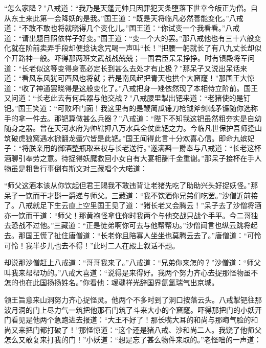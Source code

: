 \documentclass[12pt,UTF8]{ctexbook}
\begin{document}
“怎么家降？”八戒道：“我乃是天蓬元帅只因罪犯天条堕落下世幸今皈正为僧。自从东土来此第一会降妖的是我。”国王道：“既是天将临凡必然善能变化。”八戒道：“不敢不敢也将就晓得几个变化儿。”国王道：“你试变一个我看看。”八戒道：“请出题目照依样子好变。”国王道：“变一个大的罢。”那八戒他也有三十六般变化就在阶前卖弄手段却便捻诀念咒喝一声叫“长！”把腰一躬就长了有八九丈长却似个开路神一般。吓得那两班文武战战兢兢；一国君臣呆呆挣挣。时有镇殿将军问道：“长老似这等变得身高必定长到甚么去处才有止极？”那呆子又说出呆话来道：“看风东风犹可西风也将就；若是南风起把青天也拱个大窟窿！”那国王大惊道：“收了神通罢晓得是这般变化了。”八戒把身一矬依然现了本相侍立阶前。国王又问道：“长老此去有何兵器与他交战？”八戒腰里掣出钯来道：“老猪使的是钉钯。”国王笑道：“可败坏门面！我这里有的是鞭简瓜锤刀枪钺斧剑戟矛镰随你选称手的拿一件去。那钯算做甚么兵器？”八戒道：“陛下不知我这钯虽然粗夯实是自幼随身之器。曾在天河水府为帅辖押八万水兵全仗此钯之力。今临凡世保护吾师逢山筑破虎狼窝遇水掀翻龙蜃穴皆是此钯。”国王闻得此言十分欢喜心信。即命九嫔妃子：“将朕亲用的御酒整瓶取来权与长老送行。”遂满斟一爵奉与八戒道：“长老这杯酒聊引奉劳之意。待捉得妖魔救回小女自有大宴相酬千金重谢。”那呆子接杯在手人物虽是粗鲁行事倒有斯文对三藏唱个大喏道：

“师父这酒本该从你饮起但君王赐我不敢违背让老猪先吃了助助兴头好捉妖怪。”那呆子一饮而干才斟一爵递与师父。三藏道：“我不饮酒你兄弟们吃罢。”沙僧近前接了。八戒就足下生云直上空里国王见了道：“猪长老又会腾云！”呆子去了沙僧将酒亦一饮而干道：“师父！那黄袍怪拿住你时我两个与他交战只战个手平。今二哥独去恐战不过他。”三藏道：“正是徒弟啊你可去与他帮帮功。”沙僧闻言也纵云跳将起去。那国王慌了扯住唐僧道：“长老你且陪寡人坐坐也莫腾云去了。”唐僧道：“可怜可怜！我半步儿也去不得！”此时二人在殿上叙话不题。

却说那沙僧赶上八戒道：“哥哥我来了。”八戒道：“兄弟你来怎的？”沙僧道：“师父叫我来帮帮功的。”八戒大喜道：“说得是来得好。我两个努力齐心去捉那怪物虽不怎的也在此国扬扬姓名。”你看他：叆叇祥光辞国界氤氲瑞气出京城。

领王旨意来山洞努力齐心捉怪灵。他两个不多时到了洞口按落云头。八戒掣钯往那波月洞的门上尽力气一筑把他那石门筑了斗来大小的个窟窿。吓得那把门的小妖开门看见是他两个急跑进去报道：“大王不好了！那长嘴大耳的和尚与那晦气脸的和尚又来把门都打破了！”那怪惊道：“这个还是猪八戒、沙和尚二人。我饶了他师父怎么又敢复来打我的门！”小妖道：“想是忘了甚么物件来取的。”老怪咄的一声道：
\end{document}
